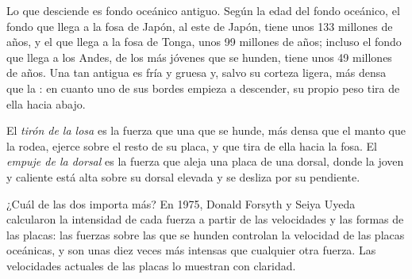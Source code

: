 Lo que desciende es fondo oceánico antiguo. Según la edad del fondo oceánico,
el fondo que llega a la fosa de Japón, al este de Japón, tiene unos 133
millones de años, y el que llega a la fosa de Tonga, unos 99 millones de
años; incluso el fondo que llega a los Andes, de los más jóvenes que se
hunden, tiene unos 49 millones de años. Una  tan antigua es fría y
gruesa y, salvo su corteza ligera, más densa que la : en cuanto uno
de sus bordes empieza a descender, su propio peso tira de ella hacia abajo.

\begin{definition}\label{def:g11:subduction-zones:slab-pull}
El \emph{tirón de la losa} es la fuerza que una 
que se hunde, más densa que el manto que la rodea, ejerce sobre el resto de su
placa, y que tira de ella hacia la fosa. El \emph{empuje de la dorsal} es la fuerza que aleja una
placa de una dorsal, donde la  joven y caliente está alta sobre su
dorsal elevada y se desliza por su pendiente.
\end{definition}

¿Cuál de las dos importa más? En 1975, Donald Forsyth y Seiya Uyeda
calcularon la intensidad de cada fuerza a partir de las velocidades y las
formas de las placas: las fuerzas sobre las  que se hunden controlan la velocidad de las placas oceánicas,
y son unas diez veces más intensas que cualquier otra fuerza. Las velocidades
actuales de las placas lo muestran con claridad.

